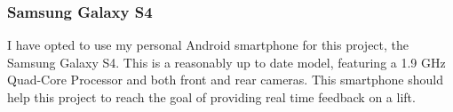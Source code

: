 \subsubsection{Samsung Galaxy S4}

I have opted to use my personal Android smartphone for this project, the Samsung Galaxy S4\cite{s4}. This is a reasonably up to date model, featuring a 1.9 GHz Quad-Core Processor and both front and rear cameras. This smartphone should help this project to reach the goal of providing real time feedback on a lift.
